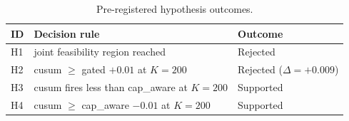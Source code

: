 \begin{table}[!t]
  \caption{Pre-registered hypothesis outcomes.}
  \label{tab:hypotheses}
  \centering
  \small
  \setlength{\tabcolsep}{4pt}
  \begin{tabular}{@{}p{0.5cm}p{4.7cm}p{2.1cm}@{}}
    \toprule
    \textbf{ID} & \textbf{Decision rule} & \textbf{Outcome} \\
    \midrule
    H1 & joint feasibility region reached & Rejected \\
    H2 & cusum $\geq$ gated $+0.01$ at $K=200$ & Rejected ($\Delta=+0.009$) \\
    H3 & cusum fires less than cap\_aware at $K=200$ & Supported \\
    H4 & cusum $\geq$ cap\_aware $-0.01$ at $K=200$ & Supported \\
    \bottomrule
  \end{tabular}
\end{table}
